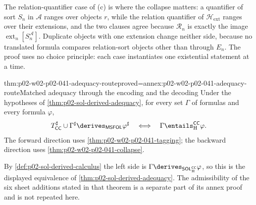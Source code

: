 The relation-quantifier case of (c) is where the collapse matters: a
quantifier of sort \(S_n\) in \(\mathcal A\) ranges over objects \(r\), while
the relation quantifier of \(\mathcal H_{\mathrm{ext}}\) ranges over their
extensions, and the two clauses agree because \(\mathcal R_n\) is exactly the
image \(\operatorname{ext}_n[S_n^{\mathcal A}]\).  Duplicate objects with one
extension change neither side, because no translated formula compares
relation-sort objects other than through \(E_n\).  The proof uses no choice
principle: each case instantiates one existential statement at a time.

\begin{hbcorollary}{thm:p02-w02-p02-041-adequacy-route}{proved=annex:p02-w02-p02-041-adequacy-route}{Matched adequacy through the encoding and the decoding}
Under the hypotheses of \cref{thm:p02-sol-derived-adequacy}, for every set
\(\Gamma\) of formulas and every formula \(\varphi\),
\[
 T_{\mathsf{CC}}^\sharp\cup\Gamma^\sharp\derives_{\mathsf{MSFOL}}\varphi^\sharp
 \quad\Longleftrightarrow\quad
 \Gamma\entails_{\mathrm H}^{\mathsf{CC}}\varphi .
\]
The forward direction uses \cref{thm:p02-w02-p02-041-tagging}; the backward
direction uses \cref{thm:p02-w02-p02-041-collapse}.
\end{hbcorollary}

By \cref{def:p02-sol-derived-calculus} the left side is
\(\Gamma\derives_{\mathsf{SOL}_{\mathrm H}^{\mathsf{CC}}}\varphi\), so this is
the displayed equivalence of \cref{thm:p02-sol-derived-adequacy}.  The
admissibility of the six sheet additions stated in that theorem is a separate
part of its annex proof and is not repeated here.

